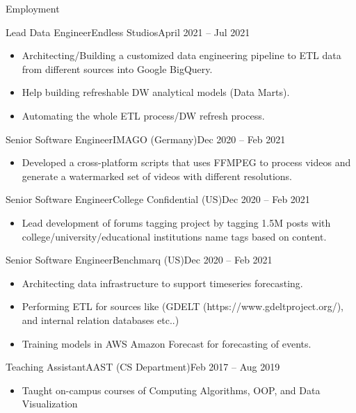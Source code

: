 \documentclass[]{ahmedamrcv}
\begin{document}
\begin{cvsection}{Employment}
		\begin{cvsubsection}{Lead Data Engineer}{Endless Studios}{April 2021 -- Jul 2021}	
			\begin{itemize}
				\item Architecting/Building a customized data engineering pipeline to ETL data from different sources into Google BigQuery.
				\item Help building refreshable DW analytical models (Data Marts).
				\item Automating the whole ETL process/DW refresh process.
			\end{itemize}
		\end{cvsubsection}

		\begin{cvsubsection}{Senior Software Engineer}{IMAGO (Germany)}{Dec 2020 -- Feb 2021}	
			\begin{itemize}
				\item Developed a cross-platform scripts that uses FFMPEG to process videos and generate a watermarked set of videos with different resolutions.
			\end{itemize}
		\end{cvsubsection}

		\begin{cvsubsection}{Senior Software Engineer}{College Confidential (US)}{Dec 2020 -- Feb 2021}	
			\begin{itemize}
				\item Lead development of forums tagging project by tagging 1.5M posts with college/university/educational institutions name tags based on content.
			\end{itemize}
		\end{cvsubsection}

		\begin{cvsubsection}{Senior Software Engineer}{Benchmarq (US)}{Dec 2020 -- Feb 2021}	
			\begin{itemize}
				\item Architecting data infrastructure to support timeseries forecasting.
				\item Performing ETL for sources like (GDELT (https://www.gdeltproject.org/), and internal relation databases etc..)
				\item Training models in AWS Amazon Forecast for forecasting of events.
			\end{itemize}
		\end{cvsubsection}
		
		\begin{cvsubsection}{Teaching Assistant}{AAST (CS Department)}{Feb 2017 -- Aug 2019}
			\begin{itemize}
				\item Taught on-campus courses of Computing Algorithms, OOP, and Data Visualization
			\end{itemize}
		\end{cvsubsection}
		

\end{cvsection}
\end{document}
